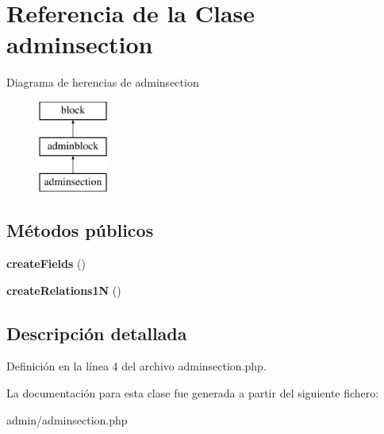 \hypertarget{classadminsection}{\section{\-Referencia de la \-Clase adminsection}
\label{classadminsection}
}
\-Diagrama de herencias de adminsection\begin{figure}[H]
\begin{center}
\leavevmode
\includegraphics[height=3.000000cm]{classadminsection}
\end{center}
\end{figure}
\subsection*{\-Métodos públicos}
\begin{DoxyCompactItemize}
\item 
\hypertarget{classadminsection_a0a7554bf943204d3ff77514ea9f1a46c}{{\bfseries create\-Fields} ()}\label{classadminsection_a0a7554bf943204d3ff77514ea9f1a46c}

\item 
\hypertarget{classadminsection_af74be6a7666ed8b360ed86f193a96e33}{{\bfseries create\-Relations1\-N} ()}\label{classadminsection_af74be6a7666ed8b360ed86f193a96e33}

\end{DoxyCompactItemize}


\subsection{\-Descripción detallada}


\-Definición en la línea 4 del archivo adminsection.\-php.



\-La documentación para esta clase fue generada a partir del siguiente fichero\-:\begin{DoxyCompactItemize}
\item 
admin/adminsection.\-php\end{DoxyCompactItemize}
